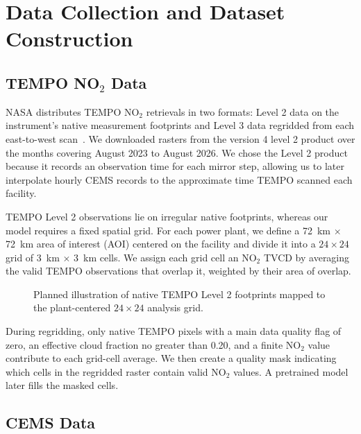 \documentclass[sigconf,nonacm]{acmart}
\begin{document}
\section{Data Collection and Dataset Construction}

\subsection{TEMPO NO\texorpdfstring{$_2$}{2} Data}

NASA distributes TEMPO NO$_2$ retrievals in two formats: Level 2 data on the
instrument's native measurement footprints and Level 3 data regridded from each
east-to-west scan~\cite{tempo2026userGuide}. We downloaded rasters from the version 4 level 2 product
over the months covering August 2023 to August 2026. We chose the Level 2 product
because it records an observation time for each mirror step, allowing us to
later interpolate hourly CEMS records to the approximate time TEMPO scanned each facility.

TEMPO Level 2 observations lie on irregular native footprints, whereas our
model requires a fixed spatial grid. For each power plant, we define a
72~km $\times$ 72~km area of interest (AOI) centered on the facility and divide it into a
$24 \times 24$ grid of 3~km $\times$ 3~km cells. We assign each grid cell
an NO$_2$ TVCD by averaging the valid TEMPO observations that overlap it,
weighted by their area of overlap.

\begin{figure}[t]
    \centering
    \caption{Planned illustration of native TEMPO Level 2 footprints mapped to
    the plant-centered $24 \times 24$ analysis grid.}
    \label{fig:tempoRegridding}
\end{figure}

During regridding, only native TEMPO pixels with a main data quality flag of
zero, an effective cloud fraction no greater than 0.20, and a finite NO$_2$
value contribute to each grid-cell average. We then create a quality mask
indicating which cells in the regridded raster contain valid NO$_2$ values.
A pretrained model later fills the masked cells.

\subsection{CEMS Data}
\end{document}
